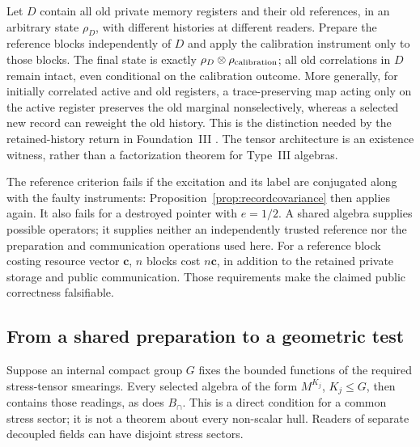 \documentclass[12pt]{article}
\theoremstyle{definition}
\theoremstyle{remark}
\begin{document}
Let \(D\) contain all old private memory registers and their old
references, in an arbitrary state \(\rho_D\), with different histories
at different readers. Prepare the reference blocks independently of
\(D\) and apply the calibration instrument only to those blocks.
The final state is exactly
\(\rho_D\otimes\rho_{\rm calibration}\); all old correlations in
\(D\) remain intact, even conditional on the calibration outcome.
More generally, for initially correlated active and old registers,
a trace-preserving map acting only on the active register preserves the
old marginal nonselectively, whereas a selected new record can reweight
the old history. This is the distinction needed by the retained-history
return in Foundation~III \cite{FoundationIII}.
The tensor architecture is an existence witness, rather than a
factorization theorem for Type~III algebras.

The reference criterion fails if the excitation and its label are
conjugated along with the faulty instruments: Proposition~\ref{prop:recordcovariance}
then applies again. It also fails for a destroyed pointer with \(e=1/2\).
A shared algebra supplies possible operators; it supplies neither an
independently trusted reference nor the preparation and communication
operations used here. For a reference block costing resource vector
\(\mathbf c\), \(n\) blocks cost \(n\mathbf c\), in addition to
the retained private storage and public communication. Those requirements
make the claimed public correctness falsifiable.

\subsection{From a shared preparation to a geometric test}

Suppose an internal compact group $G$ fixes the bounded functions of the
required stress-tensor smearings. Every selected algebra of the form $M^{K_j}$,
$K_j\le G$, then contains those readings, as does $B_\cap$. This is a direct
condition for a common stress sector; it is not a theorem about every non-scalar
hull. Readers of separate decoupled fields can have disjoint stress sectors.
\end{document}
